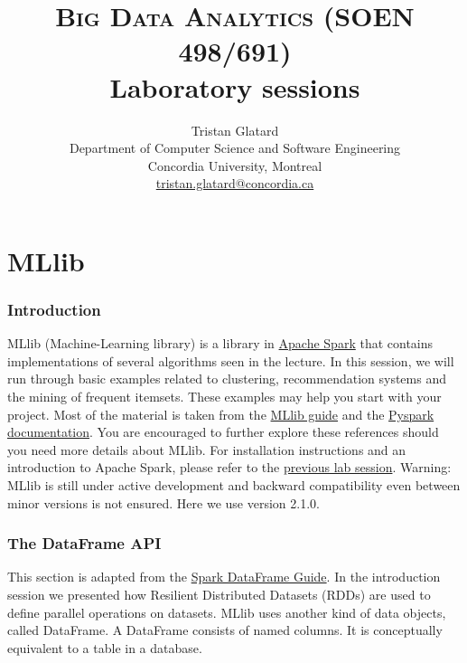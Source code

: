 \documentclass[11pt]{article}
\title{\textsc{Big Data Analytics (SOEN 498/691)} \\ Laboratory sessions}
\author{Tristan Glatard\\Department of Computer Science and Software Engineering\\Concordia University, Montreal\\\href{mailto:tristan.glatard@concordia.ca}{tristan.glatard@concordia.ca}}
\begin{document}
\maketitle

\newpage

\tableofcontents

\newpage

\part{MLlib}

\section{Introduction}

MLlib (Machine-Learning library) is a library in
\href{http://spark.apache.org}{Apache Spark} that contains
implementations of several algorithms seen in the lecture. In this
session, we will run through basic examples related to clustering,
recommendation systems and the mining of frequent itemsets. These
examples may help you start with your project. Most of the material is
taken from the
\href{http://spark.apache.org/docs/latest/ml-guide.html}{MLlib
  guide} and the \href{http://spark.apache.org/docs/latest/api/python/index.html}{Pyspark
  documentation}. You are encouraged to further explore these references should you
need more details about MLlib. For installation
instructions and an introduction to Apache Spark, please refer to the
\href{https://github.com/glatard/big-data-analytics-course/releases/download/0.8/spark.pdf}{previous
  lab session}. Warning: MLlib is still under active development and
backward compatibility even between minor versions is not
ensured. Here we use version 2.1.0.


\section{The DataFrame API}

This section is adapted from the
\href{http://spark.apache.org/docs/latest/sql-programming-guide.html}{Spark
  DataFrame Guide}. In the introduction session we presented how
Resilient Distributed Datasets (RDDs) are used to define parallel
operations on datasets. MLlib uses another kind of data objects,
called DataFrame. A DataFrame consists of named columns. It is
conceptually equivalent to a table in a database.
\end{document}
